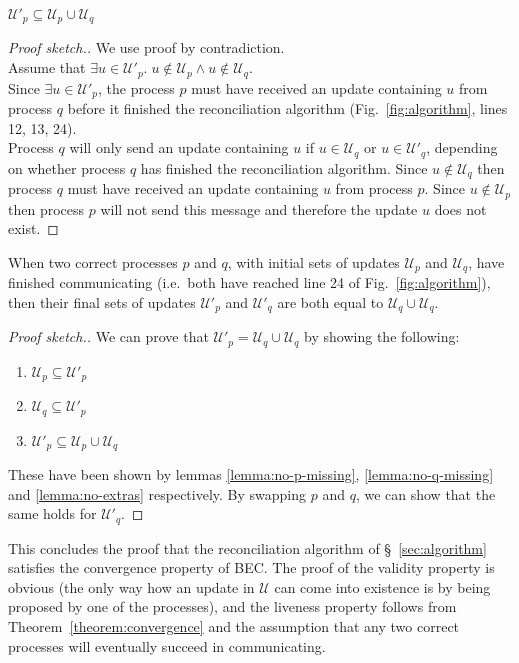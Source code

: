 \documentclass[manuscript,anonymous]{acmart}
\begin{document}
\begin{lemma}\label{lemma:no-extras}
$\mathcal{U}'_p \subseteq \mathcal{U}_p \cup \mathcal{U}_q$    
\end{lemma}
\begin{proof}[Proof sketch.]
We use proof by contradiction.\\
Assume that $\exists u \in \mathcal{U}'_p.\; u \notin \mathcal{U}_p  \land  u \notin \mathcal{U}_q$.\\
Since $\exists u \in \mathcal{U}'_p$, the process $p$ must have received an update containing $u$ from process $q$ before it finished the reconciliation algorithm (Fig.~\ref{fig:algorithm}, lines 12, 13, 24).\\
Process $q$ will only send an update containing $u$ if $u \in \mathcal{U}_q$ or $u \in \mathcal{U}'_q$, depending on whether process $q$ has finished the reconciliation algorithm.
Since $u \notin \mathcal{U}_q$ then process $q$ must have received an update containing $u$ from process $p$.
Since $u \notin \mathcal{U}_p$ then process $p$ will not send this message and therefore the update $u$ does not exist.
\end{proof}

\begin{theorem}\label{theorem:convergence}
When two correct processes $p$ and $q$, with initial sets of updates $\mathcal{U}_p$ and $\mathcal{U}_q$, have finished communicating (i.e.\ both have reached line 24 of Fig.~\ref{fig:algorithm}), then their final sets of updates $\mathcal{U}'_p$ and $\mathcal{U}'_q$  are both equal to $\mathcal{U}_q \cup \mathcal{U}_q$.
\end{theorem}
\begin{proof}[Proof sketch.]
We can prove that $\mathcal{U}'_p = \mathcal{U}_q \cup \mathcal{U}_q$ by showing the following:
\begin{enumerate}
   \item $\mathcal{U}_p \subseteq \mathcal{U}'_p$
   \item $\mathcal{U}_q \subseteq \mathcal{U}'_p$
   \item $\mathcal{U}'_p \subseteq \mathcal{U}_p \cup \mathcal{U}_q$
\end{enumerate}

These have been shown by lemmas \ref{lemma:no-p-missing}, \ref{lemma:no-q-missing} and \ref{lemma:no-extras} respectively.  
By swapping $p$ and $q$, we can show that the same holds for $\mathcal{U}'_q$.
\end{proof}

This concludes the proof that the reconciliation algorithm of \S~\ref{sec:algorithm} satisfies the convergence property of BEC.
The proof of the validity property is obvious (the only way how an update in $\mathcal{U}$ can come into existence is by being proposed by one of the processes), and the liveness property follows from Theorem~\ref{theorem:convergence} and the assumption that any two correct processes will eventually succeed in communicating.
\end{document}
